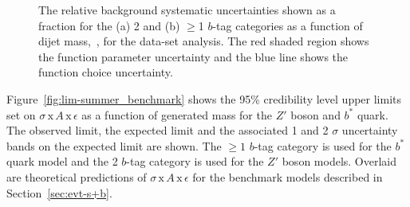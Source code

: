 \vspace{-1.5em}
\begin{figure}[!ht]
  \begin{center}
    \captionsetup[subfigure]{aboveskip=0pt,justification=centering}
    \hspace{-0.2cm}
  \end{center}
  \vspace{-1em}
  \caption[The background systematic uncertainties as a function of dijet mass
    in the \summer{} data-set analysis.]
          {The relative background systematic uncertainties shown as a fraction for the (a) 2 and (b) $\geq$1 $b$-tag categories
            as a function of dijet mass,~\mjj, for the \summer{} data-set analysis.
            The red shaded region shows the function parameter uncertainty and
            the blue line shows the function choice uncertainty.  }
          \label{fig:lim-summer_systBkg}
\end{figure}
\vspace{-0.7em}

Figure~\ref{fig:lim-summer_benchmark} shows the
95\% credibility level upper limits set on $\sigma\,\text{x}\,\mathit{A}\,\text{x}\,\epsilon$
as a function of generated mass
for the $Z'$ boson and $b^*$ quark.
The observed limit, the expected limit and the associated 1 and 2 $\sigma$ uncertainty bands on the expected limit are shown.
The $\geq1$ $b$-tag category is used for the $b^*$ quark model
and the 2 $b$-tag category is used for the $Z'$ boson models.
Overlaid are theoretical predictions of
$\sigma\,\text{x}\,\mathit{A}\,\text{x}\,\epsilon$ for the benchmark models described in Section~\ref{sec:evt-s+b}.

